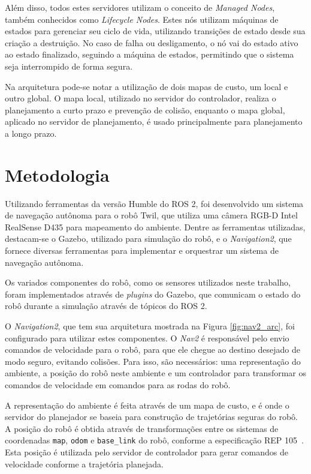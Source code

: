 \documentclass[repeatfields,xlists,xpacks,oneside,yearsonly]{ufrgscca}
\begin{document}
Além disso, todos estes servidores utilizam o conceito de \textit{Managed Nodes},
também conhecidos como \textit{Lifecycle Nodes}.
Estes nós utilizam máquinas de estados para gerenciar seu ciclo de vida, utilizando
transições de estado desde sua criação a destruição.
No caso de falha ou desligamento, o nó vai do estado ativo ao estado finalizado,
seguindo a máquina de estados, permitindo que o sistema seja interrompido
de forma segura.

Na arquitetura pode-se notar a utilização de dois mapas de custo, um local e
outro global.
O mapa local, utilizado no servidor do controlador, realiza o planejamento
a curto prazo e prevenção de colisão, enquanto o mapa global,
aplicado no servidor de planejamento, é usado principalmente
para planejamento a longo prazo.

\chapter{Metodologia}
\label{desenvolvimento}

Utilizando ferramentas da versão Humble do ROS 2, foi desenvolvido um sistema de
navegação autônoma para o robô Twil, que utiliza uma câmera RGB-D Intel RealSense D435
para mapeamento do ambiente.
Dentre as ferramentas utilizadas, destacam-se o Gazebo, utilizado para simulação do robô,
e o \textit{Navigation2}, que fornece diversas ferramentas para implementar
e orquestrar um sistema de navegação autônoma.

Os variados componentes do robô, como os sensores utilizados neste trabalho,
foram implementados através de \textit{plugins} do Gazebo,
que comunicam o estado do robô durante a simulação através de tópicos do ROS 2.

O \textit{Navigation2}, que tem sua arquitetura mostrada na Figura
\ref{fig:nav2_arc}, foi configurado para utilizar estes componentes.
O \textit{Nav2} é responsável pelo envio comandos de velocidade para o robô, para que ele chegue
ao destino desejado de modo seguro, evitando colisões.
Para isso, são necessários: uma representação do ambiente, a posição do robô neste ambiente e
um controlador para transformar os comandos de velocidade em comandos para as rodas do robô.

A representação do ambiente é feita através de um mapa de custo, e é onde o servidor do planejador
se baseia para construção de trajetórias seguras do robô.
A posição do robô é obtida através de transformações entre os sistemas de coordenadas \texttt{map},
\texttt{odom} e \texttt{base\_link} do robô, conforme a especificação REP 105~\cite{rep_105}.
Esta posição é utilizada pelo servidor de controlador para gerar comandos de velocidade conforme
a trajetória planejada.
\end{document}
